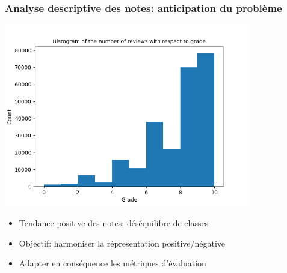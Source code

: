\documentclass{beamer}
\begin{document}
\begin{frame}
\frametitle{Analyse descriptive des notes: anticipation du problème}

\centering
\includegraphics[width=0.8\textwidth]{hist_plot_count.png}

\begin{itemize}
  \item Tendance positive des notes: déséquilibre de classes
  \item Objectif: harmoniser la répresentation positive/négative
  \item Adapter en conséquence les métriques d'évaluation 
\end{itemize}
\end{frame}
\end{document}
